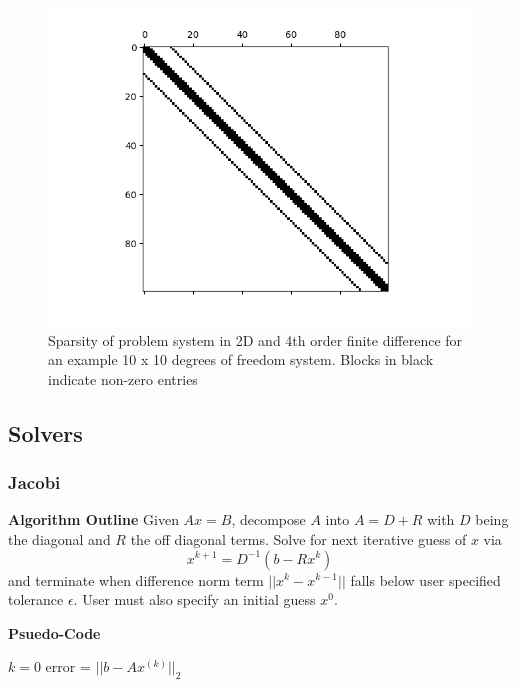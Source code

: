 \documentclass[letterpaper,12pt]{article}
\begin{document}
\begin{figure}[h]
\centering
\includegraphics[width=.9 \textwidth]{twod_sparse_4.png}
\caption{Sparsity of problem system in 2D and 4th order finite difference for an example 10 x 10 degrees of freedom system. Blocks in black indicate non-zero entries}
\label{2D4thSparse}
\end{figure}

\subsection{Solvers}
\subsubsection{Jacobi}
\textbf{Algorithm Outline}
Given $Ax=B$, decompose $A$ into $A = D + R$ with $D$ being the diagonal and $R$ the off diagonal terms. Solve for next iterative guess of $x$ via
\begin{equation}
\label{Jacobi}
x^{k+1} = D^{-1} (b - Rx^k)
\end{equation}
and terminate when difference norm term $||x^{k} - x^{k-1}||$ falls below user specified tolerance $\epsilon$. User must also specify an initial guess $x^0$.

\textbf{Psuedo-Code}

\begin{algorithm}[H]
$k = 0$\;
error = $||b - A x^{(k)}||_2$ \;
\end{algorithm}
\end{document}
